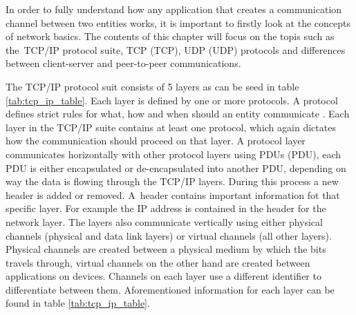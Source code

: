 In order to fully understand how any application that creates a communication channel between two entities works, it is important to firstly look at the concepts of network basics. The contents of this chapter will focus on the topis such as the~TCP/IP protocol suite, TCP (\acl{TCP}), UDP (\acl{UDP}) protocols and differences between client-server and peer-to-peer communications.

The TCP/IP protocol suit consists of 5 layers as can be seed in table \ref{tab:tcp_ip_table}. Each layer is defined by one or more protocols. A protocol defines strict rules for what, how and when should an entity communicate \cite{Forouzan2010}. Each layer in the TCP/IP suite contains at least one protocol, which again dictates how the communication should proceed on that layer. A protocol layer communicates horizontally with other protocol layers using PDUs (\acl{PDU}), each PDU is either encapsulated or de-encapsulated into another PDU, depending on way the data is flowing through the TCP/IP layers. During this process a new header is added or removed. A~header contains important information fot that specific layer. For example the IP address is contained in the header for the network layer. The layers also communicate vertically using either physical channels (physical and data link layers) or virtual channels (all other layers). Physical channels are created between a physical medium by which the bits travels through, virtual channels on the other hand are created between applications on devices. Channels on each layer use a different identifier to differentiate between them. Aforementioned information for each layer can be found in table \ref{tab:tcp_ip_table}.

